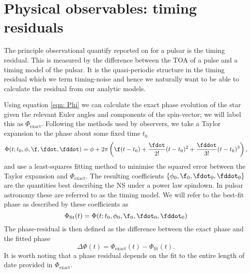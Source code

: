 \documentclass[/home/greg/Thesis/main/main.tex]{subfiles}
\begin{document}
\graphicspath{{/home/greg/Neutron_star_modelling/TimingResiduals/img/}}
\newcommand{\TimingResidualsDir}{/home/greg/Neutron_star_modelling/TimingResiduals}

\newcommand{\Phiexact}{\Phi_{\mathrm{exact}}}
\newcommand{\Phifit}{\Phi_{\mathrm{fit}}}
\newcommand{\wobbleangle}{\tilde{\theta}}
\FloatBarrier

\section{Physical observables: timing residuals}
The principle observational quantify reported on for a pulsar is the timing 
residual. This is measured by the difference between the TOA of a pulse and
a timing model of the pulsar. It is the quasi-periodic structure in
the timing residual which we term timing-noise and hence we naturally want 
to be able to calculate the residual from our analytic models.

Using equation \eqref{eqn: Phi} we can calculate the exact phase evolution of
the star given the relevant Euler angles and components of the spin-vector; we
will label this as $\Phiexact$. Following the methods used by observers, we
take a Taylor expansion to the phase about some fixed time $t_{0}$
\begin{equation}
    \Phi(t; t_{0}, \phi, \f, \fdot, \fddot) = 
    \phi + 2\pi \left(\f(t - t_{0}) + 
                          \frac{\fdot}{2!}(t-t_{0})^{2} +
                          \frac{\fddot}{3!}(t-t_{0})^{3} 
                          \right),
\label{eqn: TR taylor expansion} 
\end{equation}
and use a least-squares fitting method to minimise the squared error between
the Taylor expansion and $\Phiexact$. The resulting coefficients $\{\phi_{0},
\f_{0}, \fdot_{0}, \fddot_{0}\}$ are the quantities best describing the NS
under a power law spindown. In pulsar astronomy these are referred to as the
timing model. We will refer to the best-fit phase as described by  these
coefficients as
\begin{equation}
    \Phifit(t) = \Phi(t; t_{0}, \phi_{0}, \f_{0}, \fdot_{0}, \fddot_{0})
\end{equation}
The phase-residual is then defined as the difference between the exact phase 
and the fitted phase
\begin{equation}
  \Delta\Phi(t) = \Phiexact(t) - \Phifit(t).
\end{equation}
It is worth noting that a phase residual depends on the fit to the entire
length of date provided in $\Phiexact$. 
\end{document}
